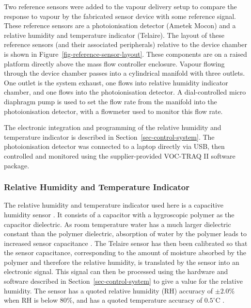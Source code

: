 \documentclass[
  a4paper,
]{scrbook}
\begin{document}
Two reference sensors were added to the vapour delivery setup to compare
the response to vapour by the fabricated sensor device with some
reference signal. These reference sensors are a photoionisation detector
(Ametek Mocon) and a relative humidity and temperature indicator
(Telaire). The layout of these reference sensors (and their associated
peripherals) relative to the device chamber is shown in
Figure~\ref{fig-reference-sensor-layout}. These components are on a
raised platform directly above the mass flow controller enclosure.
Vapour flowing through the device chamber passes into a cylindrical
manifold with three outlets. One outlet is the system exhaust, one flows
into relative humidity indicator chamber, and one flows into the
photoionisation detector. A dial-controlled micro diaphragm pump is used
to set the flow rate from the manifold into the photoionisation
detector, with a flowmeter used to monitor this flow rate.

The electronic integration and programming of the relative humidity and
temperature indicator is described in Section~\ref{sec-control-system}.
The photoionisation detector was connected to a laptop directly via USB,
then controlled and monitored using the supplier-provided VOC-TRAQ II
software package.

\hypertarget{relative-humidity-and-temperature-indicator}{%
\subsubsection*{Relative Humidity and Temperature
Indicator}\label{relative-humidity-and-temperature-indicator}}

The relative humidity and temperature indicator used here is a
capacitive humidity sensor \autocite{Telairesensor}. It consists of a
capacitor with a hygroscopic polymer as the capacitor dielectric. As
room temperature water has a much larger dielectric constant than the
polymer dielectric, absorption of water by the polymer leads to
increased sensor capacitance \autocite{capacitivesensor}. The Telaire
sensor has then been calibrated so that the sensor capacitance,
corresponding to the amount of moisture absorbed by the polymer and
therefore the relative humidity, is translated by the sensor into an
electronic signal. This signal can then be processed using the hardware
and software described in Section~\ref{sec-control-system} to give a
value for the relative humidity. The sensor has a quoted relative
humidity (RH) accuracy of \(\pm 2.0\)\% when RH is below 80\%, and has a
quoted temperature accuracy of \(0.5^\circ\)C \autocite{Telairesensor}.
\end{document}
